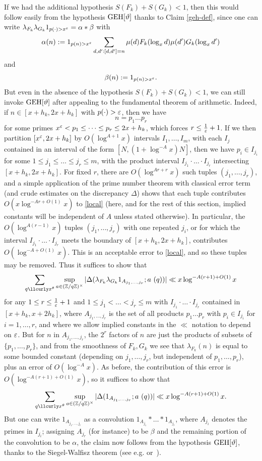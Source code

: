 If we had the additional hypothesis $S(F_k) + S(G_k) < 1$, then this would follow easily from the hypothesis $\operatorname*{GEH}[\vartheta]$ thanks to Claim \ref{geh-def}, since one can write $\lambda_{F_k} \lambda_{G_k} 1_{p(\cdot) > x^\varepsilon} = \alpha \ast \beta$ with
$$ \alpha(n) := 1_{p(n) > x^\varepsilon} \sum_{d,d': [d,d'] = n} \mu(d) F_k(\log_x d) \mu(d') G_k(\log_x d')$$
and
$$ \beta(n) := 1_{p(n) > x^\varepsilon}.$$
But even in the absence of the hypothesis $S(F_k) + S(G_k) < 1$, we can still invoke $\operatorname*{GEH}[\vartheta]$ after appealing to the fundamental theorem of arithmetic.  Indeed, if $n \in [x+h_k,2x+h_k]$ with $p(\cdot) > \varepsilon$, then we have
$$ n = p_1 \dots p_r$$
for some primes $x^\varepsilon < p_1 \leq \dots \leq p_r \leq 2x+h_k$, which forces $r \leq \frac{1}{\varepsilon}+1$.  If we then partition $[x^\varepsilon,2x+h_k]$ by $O( \log^{A+1} x )$ intervals $I_1,\dots,I_m$, with each $I_j$ contained in an interval of the form $[N, (1+\log^{-A} x) N]$, then we have $p_i \in I_{j_i}$ for some $1 \leq j_1 \leq \dots \leq j_r \leq m$, with the product interval $I_{j_1} \cdot \dots \cdot I_{j_r}$ intersecting $[x+h_k, 2x+h_k]$.  For fixed $r$, there are $O( \log^{Ar+r} x)$ such tuples $(j_1,\dots,j_r)$, and a simple application of the prime number theorem with classical error term (and crude estimates on the discrepancy $\Delta$) shows that each tuple contributes $O( x \log^{-Ar+O(1)} x)$ to \eqref{local} (here, and for the rest of this section, implied constants will be independent of $A$ unless stated otherwise). In particular, the $O(\log^{A(r-1)}{x})$ tuples $(j_1,\dots,j_r)$ with one repeated $j_i$, or for which the interval $I_{j_1} \cdot \dots \cdot I_{j_r}$ meets the boundary of $[x+h_k, 2x+h_k]$, contributes $O(\log^{-A+O(1)}{x})$. This is an acceptable error to \eqref{local}, and so these tuples may be removed.  Thus it suffices to show that 
$$
\sum_{q \lessapprox x^\theta} \sup_{a \in (\Z/q\Z)^\times} |\Delta( \lambda_{F_k} \lambda_{G_k} 1_{A_{j_1,\dots,j_r}};  a\ (q))| \ll x \log^{-A(r+1)+O(1)} x
$$
for any $1 \leq r \leq \frac{1}{\varepsilon}+1$ and $1 \leq j_1 < \dots < j_r \leq m$ with $I_{j_1} \cdot \dots \cdot I_{j_r}$ contained in $[x+h_k,x+2h_k]$, where $A_{j_1,\dots,j_r}$ is the set of all products $p_1 \dots p_r$ with $p_i \in I_{j_i}$ for $i=1,\dots,r$, and where we allow implied constants in the $\ll$ notation to depend on $\varepsilon$.  But for $n$ in $A_{j_1,\dots,j_r}$, the $2^r$ factors of $n$ are just the products of subsets of $\{p_1,\dots,p_r\}$, and from the smoothness of $F_k,G_k$ we see that $\lambda_{F_k}(n)$ is equal to some bounded constant (depending on $j_1,\dots,j_r$, but independent of $p_1,\dots,p_r$), plus an error of $O(\log^{-A} x)$.  As before, the contribution of this error is $O( \log^{-A(r+1)+O(1)} x)$, so it suffices to show that
$$
\sum_{q \lessapprox x^\theta} \sup_{a \in (\Z/q\Z)^\times} |\Delta( 1_{A_{j_1,\dots,j_r}};  a\ (q))| \ll x \log^{-A(r+1)+O(1)} x.
$$
But one can write $1_{A_{j_1,\dots,j_r}}$ as a convolution $1_{A_{j_1}} \ast \dots \ast 1_{A_{j_r}}$, where $A_{j_i}$ denotes the primes in $I_{j_i}$; assigning $A_{j_r}$ (for instance) to be $\beta$ and the remaining portion of the convolution to be $\alpha$, the claim now follows from the hypothesis $\operatorname*{GEH}[\vartheta]$, thanks to the Siegel-Walfisz theorem (see e.g. \cite[Satz 4]{siebert} or~\cite[Th. 5.29]{ik}).


